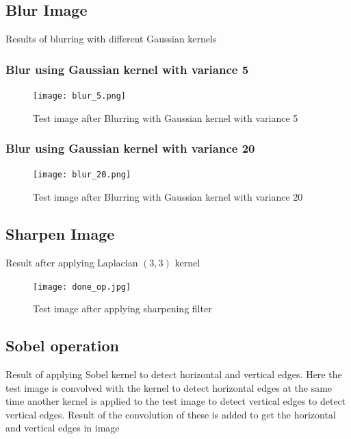 \documentclass{article}
\begin{document}
\subsection[h]{Blur Image}Results of blurring with different Gaussian kernels
\subsubsection[h]{Blur using Gaussian kernel with variance 5 }
\begin{figure}[htb]

\begin{minipage}[b]{1.0\linewidth}
  \centering
  \centerline{\texttt{[image: blur\_5.png]}}
  \centerline{Test image after Blurring with Gaussian kernel with variance 5}\medskip
\end{minipage}
%
\end{figure}
\subsubsection[h]{Blur using Gaussian kernel with variance 20}
\begin{figure}[h]

\begin{minipage}[b]{1.0\linewidth}
  \centering
  \centerline{\texttt{[image: blur\_20.png]}}
  \centerline{Test image after Blurring with Gaussian kernel with variance 20}\medskip
\end{minipage}
%
\end{figure}


\subsection[h]{Sharpen Image}Result after applying Laplacian $(3,3)$ kernel
\begin{figure}[h]

\begin{minipage}[b]{1.0\linewidth}
  \centering
  \centerline{\texttt{[image: done\_op.jpg]}}
  \centerline{Test image after applying sharpening filter}\medskip
\end{minipage}
%
\end{figure}


\subsection[h]{Sobel operation}Result of applying Sobel kernel to detect horizontal and vertical edges. Here the test image is convolved with the kernel to detect horizontal edges at the same time another kernel is applied to the test image to detect vertical edges to detect vertical edges. Result of the convolution of these is added to get the horizontal and vertical edges in image
\end{document}
